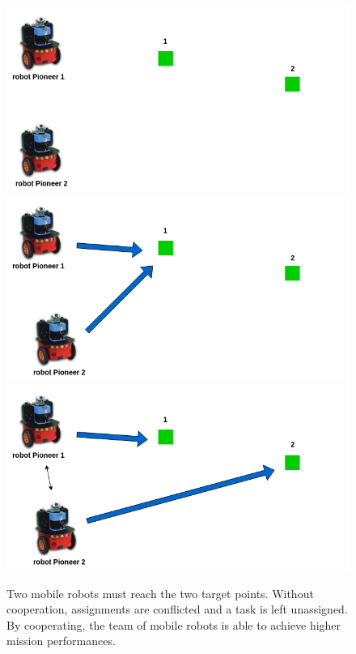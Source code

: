 \documentclass[letterpaper, 10 pt, conference]{ieeeconf}  %
\begin{document}
\begin{figure}[b!]
  \includegraphics[width=\linewidth]{konflikt1.png}
\endminipage\hfill
{}
  \includegraphics[width=\linewidth]{konflikt2.png}
\endminipage\hfill
{}%
  \includegraphics[width=\linewidth]{konflikt3.png}
\endminipage
\caption{Two mobile robots must reach the two target points. Without cooperation, assignments are conflicted and a task is left unassigned. By cooperating, the team of mobile robots is able to achieve higher mission performances.}
\label{fig:konflikt}
\end{figure}  
\end{document}
